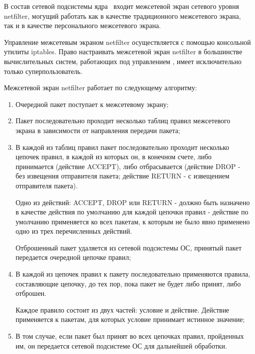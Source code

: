 	В состав сетевой подсистемы ядра \linux\ входит межсетевой экран сетевого уровня netfilter, могущий работать как
	в качестве традиционного межсетевого экрана, так и в качестве персонального межсетевого экрана.

	Управление межсетевым экраном netfilter осуществляется с помощью консольной утилиты iptables. Право настраивать
	межсетевой экран netfilter в большинстве вычислительных систем, работающих под управлением \linux,
	имеет исключительно только суперпользователь.

	Межсетевой экран netfilter работает по следующему алгоритму:

	\begin{enumerate}

		\item Очередной пакет поступает к межсетевому экрану;

		\item Пакет последовательно проходит несколько таблиц правил межсетевого экрана в зависимости
		от направления передачи пакета;
		
		\item В каждой из таблиц правил пакет последовательно проходит несколько цепочек правил,
		в каждой из которых он, в конечном счете, либо принимается (действие ACCEPT), либо отбрасывается
		(действие DROP - без извещения отправителя пакета; действие RETURN - с извещением отправителя пакета).

		Одно из действий: ACCEPT, DROP или RETURN - должно быть назначено в качестве действия по умолчанию
		для каждой цепочки правил - действие по умолчанию применяется ко всех пакетам,
		к которым не было явно применено одно из трех перечисленных действий.

		Отброшенный пакет удаляется из сетевой подсистемы ОС, принятый пакет передается очередной цепочке правил;

		\item В каждой из цепочек правил к пакету последовательно применяются правила, составляющие цепочку,
		до тех пор, пока пакет не будет либо принят, либо отброшен.

		Каждое правило состоит из двух частей: условие и действие. Действие применяется к пакетам,
		для которых условие принимает истинное значение;

		\item В том случае, если пакет был принят во всех цепочках правил, пройденных им, он передается сетевой
		подсистеме ОС для дальнейшей обработки.

	\end{enumerate}

